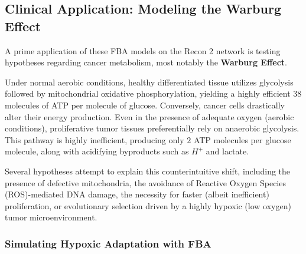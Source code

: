 
\subsection{Clinical Application: Modeling the Warburg Effect}
\label{subsec:warburg_effect}

A prime application of these FBA models on the Recon 2 network is testing hypotheses regarding cancer metabolism, most notably the \textbf{Warburg Effect}.

Under normal aerobic conditions, healthy differentiated tissue utilizes glycolysis followed by mitochondrial oxidative phosphorylation, yielding a highly efficient \(38\) molecules of ATP per molecule of glucose. Conversely, cancer cells drastically alter their energy production. Even in the presence of adequate oxygen (aerobic conditions), proliferative tumor tissues preferentially rely on anaerobic glycolysis. This pathway is highly inefficient, producing only \(2\) ATP molecules per glucose molecule, along with acidifying byproducts such as \(H^+\) and lactate.


Several hypotheses attempt to explain this counterintuitive shift, including the presence of defective mitochondria, the avoidance of Reactive Oxygen Species (ROS)-mediated DNA damage, the necessity for faster (albeit inefficient) proliferation, or evolutionary selection driven by a highly hypoxic (low oxygen) tumor microenvironment.

\subsubsection{Simulating Hypoxic Adaptation with FBA}

